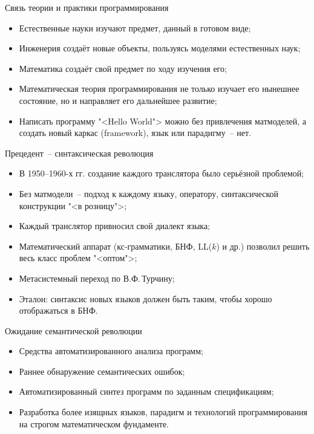 \documentclass[landscape]{slides}
\begin{document}
\begin{slide}
Связь теории и практики программирования
\begin{itemize}
\item Естественные науки изучают предмет, данный в готовом виде;
\item Инженерия создаёт новые объекты, пользуясь моделями естественных наук;
\item Математика создаёт свой предмет по ходу изучения его;
\item Математическая теория программирования не только изучает его нынешнее
      состояние, но и направляет его дальнейшее развитие;
\item Написать программу "<Hello World"> можно без привлечения
        матмоделей, а создать новый каркас (framework), язык или
        парадигму~-- нет.
\end{itemize}
\end{slide}

\begin{slide}
Прецедент~-- синтаксическая революция
\begin{itemize}
\item В 1950--1960-х гг. создание каждого транслятора было серьёзной проблемой;
\item Без матмодели~-- подход к каждому языку, оператору, синтаксической
        конструкции "<в розницу">;
\item Каждый транслятор привносил свой диалект языка;
\item Математический аппарат (кс-грамматики, БНФ, LL($k$) и др.) позволил
        решить весь класс проблем "<оптом">;
\item Метасистемный переход по В.Ф.\,Турчину;
\item Эталон: синтаксис новых языков должен быть таким, чтобы хорошо
        отображаться в БНФ.
\end{itemize}
\end{slide}

\begin{slide}
Ожидание семантической революции
\begin{itemize}
\item Средства автоматизированного анализа программ;
\item Раннее обнаружение семантических ошибок;
\item Автоматизированный синтез программ по заданным спецификациям;
\item Разработка более изящных языков, парадигм и технологий программирования
      на строгом математическом фундаменте.
\end{itemize}
\end{slide}
\end{document}
